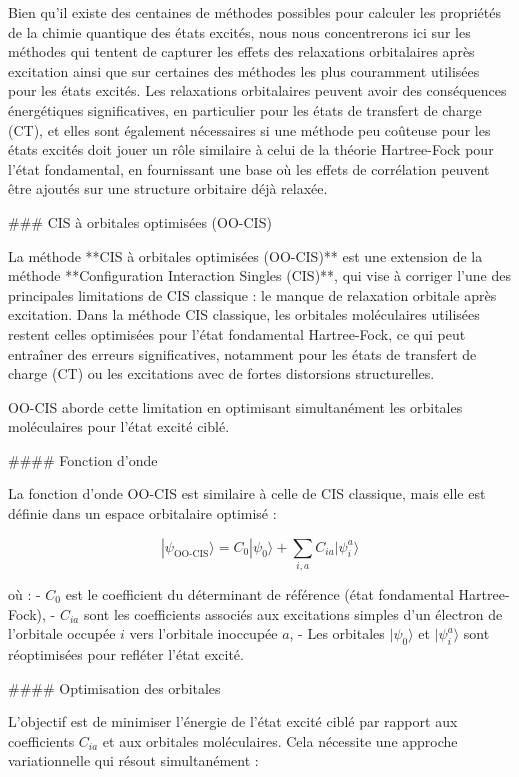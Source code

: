 \documentclass[12pt,a4paper]{report}
\begin{document}
\begin{markdown}
Bien qu'il existe des centaines de méthodes possibles pour calculer les propriétés de la chimie quantique des états excités, nous nous concentrerons ici sur les méthodes qui tentent de capturer les effets des relaxations orbitalaires après excitation ainsi que sur certaines des méthodes les plus couramment utilisées pour les états excités. Les relaxations orbitalaires peuvent avoir des conséquences énergétiques significatives, en particulier pour les états de transfert de charge (CT), et elles sont également nécessaires si une méthode peu coûteuse pour les états excités doit jouer un rôle similaire à celui de la théorie Hartree-Fock pour l'état fondamental, en fournissant une base où les effets de corrélation peuvent être ajoutés sur une structure orbitaire déjà relaxée.


### CIS à orbitales optimisées (OO-CIS)

La méthode **CIS à orbitales optimisées (OO-CIS)** est une extension de la méthode **Configuration Interaction Singles (CIS)**, qui vise à corriger l'une des principales limitations de CIS classique : le manque de relaxation orbitale après excitation. Dans la méthode CIS classique, les orbitales moléculaires utilisées restent celles optimisées pour l'état fondamental Hartree-Fock, ce qui peut entraîner des erreurs significatives, notamment pour les états de transfert de charge (CT) ou les excitations avec de fortes distorsions structurelles.

OO-CIS aborde cette limitation en optimisant simultanément les orbitales moléculaires pour l’état excité ciblé.

#### Fonction d'onde

La fonction d'onde OO-CIS est similaire à celle de CIS classique, mais elle est définie dans un espace orbitalaire optimisé :

\[
|\psi_{\text{OO-CIS}}\rangle = C_0 |\psi_0\rangle + \sum_{i,a} C_{ia} |\psi_i^a\rangle
\]

où :
- \(C_0\) est le coefficient du déterminant de référence (état fondamental Hartree-Fock),
- \(C_{ia}\) sont les coefficients associés aux excitations simples d'un électron de l'orbitale occupée \(i\) vers l'orbitale inoccupée \(a\),
- Les orbitales \(|\psi_0\rangle\) et \(|\psi_i^a\rangle\) sont réoptimisées pour refléter l'état excité.

#### Optimisation des orbitales

L’objectif est de minimiser l'énergie de l'état excité ciblé par rapport aux coefficients \(C_{ia}\) et aux orbitales moléculaires. Cela nécessite une approche variationnelle qui résout simultanément :


\end{markdown}
\end{document}
